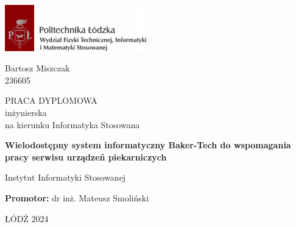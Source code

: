 \begin{flushright}
    \includegraphics[height=2cm]{images/logoFTIMS.png}
\end{flushright}


\centering
\vspace{50pt}

{
    \large
    Bartosz Miszczak \\
    236605
    \par
}

\vfill

{\Large PRACA DYPLOMOWA\\
\Large inżynierska\\
\large na kierunku Informatyka Stosowana}\par
\vfill


{
    \Large\bfseries
    {\fontsize{16pt}{18pt}\selectfont
    Wielodostępny system informatyczny Baker-Tech do wspomagania pracy serwisu urządzeń piekarniczych
    }
    \par
}

\vfill


\raggedright
{
    \large
    Instytut Informatyki Stosowanej
    \par
}
{
    \large
    \textbf{Promotor:}
    dr inż. Mateusz Smoliński
    \par
}
\vspace{24pt}

\centering
{\large ŁÓDŹ 2024 \par}